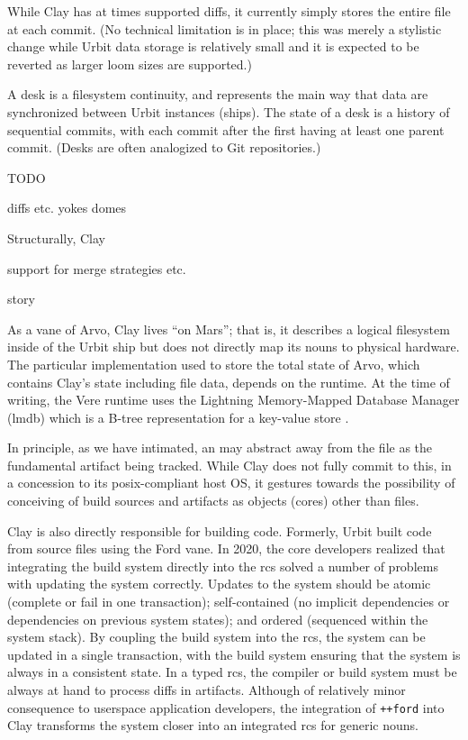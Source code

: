 \documentclass[twoside]{article}
\begin{document}
While Clay has at times supported diffs, it currently simply stores the entire file at each commit.  (No technical limitation is in place; this was merely a stylistic change while Urbit data storage is relatively small and it is expected to be reverted as larger loom sizes are supported.)

A desk is a filesystem continuity, and represents the main way that data are synchronized between Urbit instances (ships).  The state of a desk is a history of sequential commits, with each commit after the first having at least one parent commit.  (Desks are often analogized to Git repositories.)

TODO


diffs
etc.
yokes domes

Structurally, Clay 

support for merge strategies etc.

story

As a vane of Arvo, Clay lives ``on Mars''; that is, it describes a logical filesystem inside of the Urbit ship but does not directly map its nouns to physical hardware.  The particular implementation used to store the total state of Arvo, which contains Clay's state including file data, depends on the runtime.  At the time of writing, the Vere runtime uses the Lightning Memory-Mapped Database Manager ({\sc lmdb}) which is a B-tree representation for a key-value store \citep{LMDB}.

In principle, as we have intimated, an {\rcs} may abstract away from the file as the fundamental artifact being tracked.  While Clay does not fully commit to this, in a concession to its {\sc posix}-compliant host OS, it gestures towards the possibility of conceiving of build sources and artifacts as objects (cores) other than files.

Clay is also directly responsible for building code.  Formerly, Urbit built code from source files using the Ford vane.  In 2020, the core developers realized that integrating the build system directly into the {\sc rcs} solved a number of problems with updating the system correctly.  Updates to the system should be atomic (complete or fail in one transaction); self-contained (no implicit dependencies or dependencies on previous system states); and ordered (sequenced within the system stack).  By coupling the build system into the {\sc rcs}, the system can be updated in a single transaction, with the build system ensuring that the system is always in a consistent state.  In a typed {\sc rcs}, the compiler or build system must be always at hand to process diffs in artifacts.  Although of relatively minor consequence to userspace application developers, the integration of \lstinline[style=inlinecode]{++ford} into Clay transforms the system closer into an integrated {\sc rcs} for generic nouns.
\end{document}
